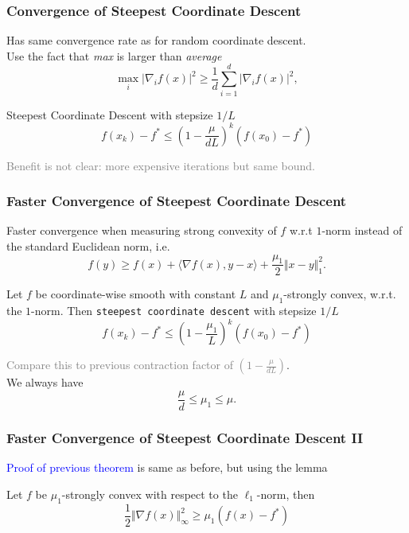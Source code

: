 \documentclass[aspectratio=149]{beamer}
\begin{document}
\begin{frame}
  \frametitle{Convergence of Steepest Coordinate Descent}
  Has same convergence rate as for random coordinate descent.\\
  Use the fact that \emph{max} is larger than \emph{average}
  \begin{equation}
    \max_i \vert \nabla_i f(x) \vert^2 \ge  \frac{1}{d} \sum_{i=1}^{d} \vert \nabla_i f(x) \vert^2,
  \end{equation}
  \begin{corollary}%
    Steepest Coordinate Descent with stepsize $1/L$
  \begin{equation}
      f(x_k)- f^* \le {\left(1 - \frac{\mu}{d L}\right)}^k (f(x_0)-f^*)
  \end{equation}
  \end{corollary}
  \textcolor{gray}{Benefit is not clear: more expensive iterations but same bound.}
\end{frame}


\begin{frame}
  \frametitle{Faster Convergence of Steepest Coordinate Descent}
  Faster convergence when measuring strong convexity of $f$ w.r.t $1$-norm instead of the standard Euclidean norm, i.e.
  \begin{equation}
      f(y) \ge f(x) + \langle \nabla f(x), y-x \rangle + \frac{\mu_1}{2} \Vert x-y \Vert_1^2.
  \end{equation}

  \begin{theorem}
    Let $f$ be coordinate-wise smooth with constant $L$ and $\mu_1$-strongly convex, w.r.t. the $1$-norm.
    Then \colorbox{grey!30}{\textup{\texttt{steepest coordinate descent}}} with stepsize $1/L$
    \begin{equation}
      f(x_k)- f^* \le {\left(1 - \frac{\mu_1}{L}\right)}^k (f(x_0)-f^*)
    \end{equation}
  \end{theorem}
  \textcolor{gray}{Compare this to previous contraction factor of $(1-\frac{\mu}{d L})$}.\\
  We always have
  \begin{equation}
    \frac{\mu}{d} \le \mu_1 \le \mu.
  \end{equation}
\end{frame}


\begin{frame}
  \frametitle{Faster Convergence of Steepest Coordinate Descent II}
  \textcolor{blue}{Proof of previous theorem} is same as before, but using the lemma

  \begin{lemma}%
    Let $f$ be $\mu_1$-strongly convex with respect to the $\ell_1$-norm, then
    \begin{equation}
      \frac12 \Vert \nabla f(x) \Vert^2_\infty \ge \mu_1 (f(x)-f^*)
    \end{equation}

  \end{lemma}
\end{frame}
\end{document}
